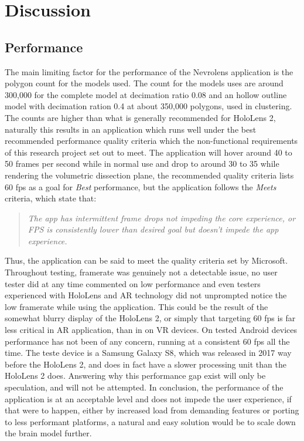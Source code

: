 \chapter{Discussion}



\section{Performance}\label{chap:discussperformance}

The main limiting factor for the performance of the Nevrolens application is the polygon count for the models used. The count for the models uses are around 300,000 for the complete model at decimation ratio 0.08 and an hollow outline model with decimation ration 0.4 at about 350,000 polygons, used in clustering. The counts are higher than what is generally recommended for HoloLens 2, naturally this results in an application which runs well under the best recommended performance quality criteria which the non-functional requirements of this research project set out to meet. The application will hover around 40 to 50 frames per second while in normal use and drop to around 30 to 35 while rendering the volumetric dissection plane, the recommended quality criteria lists 60 fps as a goal for \textit{Best} performance, but the application follows the \textit{Meets} criteria, which state that:
\begin{quote}
\textit{The app has intermittent frame drops not impeding the core experience, or FPS is consistently lower than desired goal but doesn’t impede the app experience.}
\end{quote}
Thus, the application can be said to meet the quality criteria set by Microsoft. 
Throughout testing, framerate was genuinely not a detectable issue, no user tester did at any time commented on low performance and even testers experienced with HoloLens and AR technology did not unprompted notice the low framerate while using the application. This could be the result of the somewhat blurry display of the HoloLens 2, or simply that targeting 60 fps is far less critical in AR application, than in on VR devices. 
On tested Android devices performance has not been of any concern, running at a consistent 60 fps all the time. The teste device is a Samsung Galaxy S8, which was released in 2017 way before the HoloLens 2, and does in fact have a slower processing unit than the HoloLens 2 does. Answering why this performance gap exist will only be speculation, and will not be attempted.
In conclusion, the performance of the application is at an acceptable level and does not impede the user experience, if that were to happen, either by increased load from demanding features or porting to less performant platforms, a natural and easy solution would be to scale down the brain model further.

